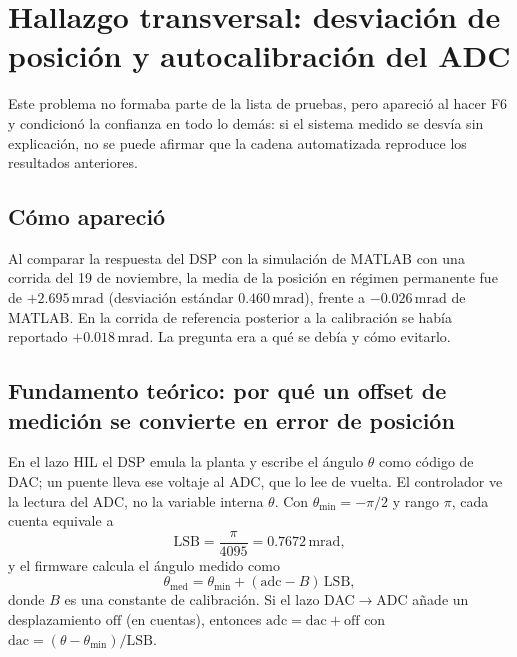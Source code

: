 \documentclass[12pt,letterpaper]{article}
\newcommand{\mrad}{\,\mathrm{mrad}}
\begin{document}
\section{Hallazgo transversal: desviación de posición y autocalibración del ADC}
\label{sec:offset}

Este problema no formaba parte de la lista de pruebas, pero apareció al hacer F6 y condicionó la confianza en todo lo demás: si el sistema medido se desvía sin explicación, no se puede afirmar que la cadena automatizada reproduce los resultados anteriores.

\subsection{Cómo apareció}

Al comparar la respuesta del DSP con la simulación de MATLAB con una corrida del 19 de noviembre, la media de la posición en régimen permanente fue de $+2.695\mrad$ (desviación estándar $0.460\mrad$), frente a $-0.026\mrad$ de MATLAB. En la corrida de referencia posterior a la calibración se había reportado $+0.018\mrad$. La pregunta era a qué se debía y cómo evitarlo.

\subsection{Fundamento teórico: por qué un offset de medición se convierte en error de posición}

En el lazo HIL el DSP emula la planta y escribe el ángulo $\theta$ como código de DAC; un puente lleva ese voltaje al ADC, que lo lee de vuelta. El controlador ve la lectura del ADC, no la variable interna $\theta$. Con $\theta_{\min}=-\pi/2$ y rango $\pi$, cada cuenta equivale a
\begin{equation}
\mathrm{LSB}=\frac{\pi}{4095}=0.7672\mrad,
\label{eq:lsb}
\end{equation}
y el firmware calcula el ángulo medido como
\begin{equation}
\theta_{\mathrm{med}}=\theta_{\min}+(\mathrm{adc}-B)\,\mathrm{LSB},
\label{eq:med}
\end{equation}
donde $B$ es una constante de calibración. Si el lazo DAC$\rightarrow$ADC añade un desplazamiento $\mathrm{off}$ (en cuentas), entonces $\mathrm{adc}=\mathrm{dac}+\mathrm{off}$ con $\mathrm{dac}=(\theta-\theta_{\min})/\mathrm{LSB}$.
\end{document}

